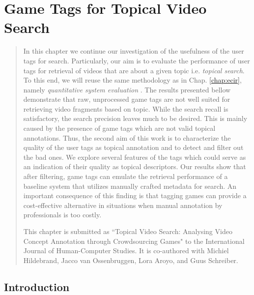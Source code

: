 \chapter{Game Tags for Topical Video Search}\label{chap:topicir-filter}
\begin{quotation}
\noindent
In this chapter we continue our investigation of the usefulness of the user tags for search. Particularly, our aim is to evaluate the performance of user tags for retrieval of videos that are about a given topic i.e. \textit{topical search}. To this end, we will reuse the same methodology as in Chap. \ref{chap:ecir}, namely \textit{quantitative system evaluation} \cite{vorhees}. The results presented bellow demonstrate that raw, unprocessed game tags are not well suited for retrieving video fragments based on topic. While the search recall is satisfactory, the search precision leaves much to be desired. This is mainly caused by the presence of game tags which are not valid topical annotations. Thus, the second aim of this work is to characterize the quality of the user tags as topical annotation and to detect and filter out the bad ones. We explore several features of the tags which could serve as an indication of their quality as topical descriptors. Our results show that after filtering, game tags can emulate the retrieval performance of a baseline system that utilizes manually crafted metadata for search. An important consequence of this finding is that tagging games can provide a cost-effective alternative in situations when manual annotation by professionals is too costly.

This chapter is submitted as ``Topical Video Search: Analysing Video Concept Annotation through Crowdsourcing Games" to the International Journal of Human-Computer Studies. It is co-authored with Michiel Hildebrand, Jacco van Ossenbruggen, Lora Aroyo, and Guus Schreiber.


\end{quotation}

\section{Introduction}

